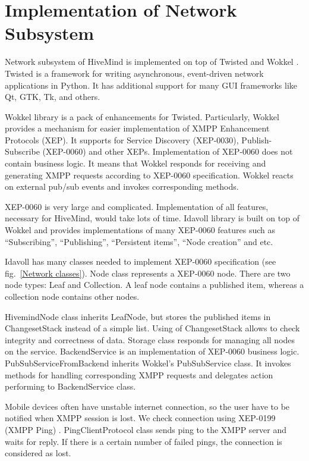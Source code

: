\section{Implementation of Network Subsystem}

Network subsystem of HiveMind is implemented on top of Twisted \cite{twisted} and
Wokkel \cite{wokkel}. Twisted is a framework for writing asynchronous,
event-driven network applications in Python. It has additional support for many
GUI frameworks like Qt, GTK, Tk, and others.

Wokkel library is a pack of enhancements for Twisted. Particularly, Wokkel
provides a mechanism for easier implementation of XMPP Enhancement Protocols
(XEP). It supports for Service Discovery (XEP-0030), Publish-Subscribe
(XEP-0060) and other XEPs. Implementation of XEP-0060 does not contain business
logic. It means that Wokkel responds for receiving and generating XMPP requests
according to XEP-0060 specification. Wokkel reacts on external pub/sub events
and invokes corresponding methods.

XEP-0060 is very large and complicated. Implementation of all features,
necessary for HiveMind, would take lots of time. Idavoll library is built on top
of Wokkel and provides implementations of many XEP-0060 features such as
``Subscribing'', ``Publishing'', ``Persistent items'', ``Node creation'' and
etc.

Idavoll has many classes needed to implement XEP-0060 specification (see
fig.~\ref{Network classes}). Node class represents a XEP-0060 node. There are
two node types: Leaf and Collection. A leaf node contains a published item,
whereas a collection node contains other nodes.

HivemindNode class inherits LeafNode, but stores the published items in
ChangesetStack instead of a simple list. Using of ChangesetStack allows to check
integrity and correctness of data. Storage class responds for managing all nodes
on the service. BackendService is an implementation of XEP-0060 business logic.
PubSubServiceFromBackend inherits Wokkel's PubSubService class. It invokes
methods for handling corresponding XMPP requests and delegates action performing
to BackendService class.

Mobile devices often have unstable internet connection, so the user have to be
notified when XMPP session is lost. We check connection using XEP-0199 (XMPP
Ping) \cite{ping-xep-0199}. PingClientProtocol class sends ping to the XMPP
server and waits for reply. If there is a certain number of failed pings, the
connection is considered as lost.

